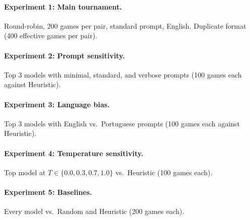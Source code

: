 \paragraph{Experiment 1: Main tournament.} Round-robin, 200 games per pair, standard prompt, English. Duplicate format (400 effective games per pair).

\paragraph{Experiment 2: Prompt sensitivity.} Top 3 models with minimal, standard, and verbose prompts (100 games each against Heuristic).

\paragraph{Experiment 3: Language bias.} Top 3 models with English vs.\ Portuguese prompts (100 games each against Heuristic).

\paragraph{Experiment 4: Temperature sensitivity.} Top model at $T \in \{0.0, 0.3, 0.7, 1.0\}$ vs.\ Heuristic (100 games each).

\paragraph{Experiment 5: Baselines.} Every model vs.\ Random and Heuristic (200 games each).
